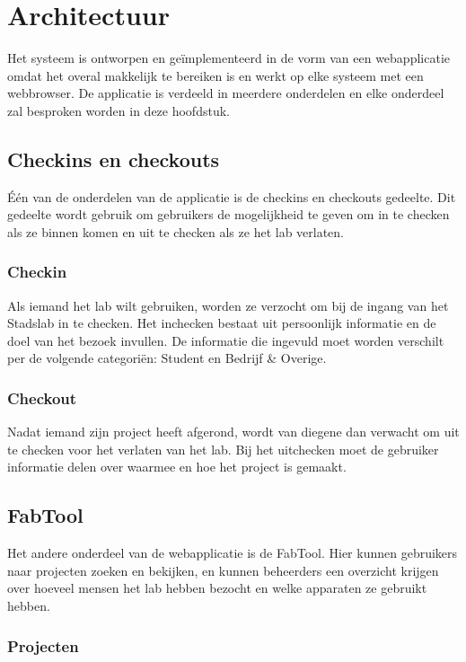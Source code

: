 \chapter{Architectuur}

Het systeem is ontworpen en ge\"implementeerd in de vorm van een webapplicatie omdat het overal makkelijk te bereiken is en werkt op elke systeem met een webbrowser. De applicatie is verdeeld in meerdere onderdelen en elke onderdeel zal besproken worden in deze hoofdstuk.

\section{Checkins en checkouts}

\'E\'en van de onderdelen van de applicatie is de checkins en checkouts gedeelte. Dit gedeelte wordt gebruik om gebruikers de mogelijkheid te geven om in te checken als ze binnen komen en uit te checken als ze het lab verlaten.

\subsection{Checkin}

Als iemand het lab wilt gebruiken, worden ze verzocht om bij de ingang van het Stadslab in te checken. Het inchecken bestaat uit persoonlijk informatie en de doel van het bezoek invullen. De informatie die ingevuld moet worden verschilt per de volgende categori\"en: Student en Bedrijf \& Overige.

\subsection{Checkout}

Nadat iemand zijn project heeft afgerond, wordt van diegene dan verwacht om uit te checken voor het verlaten van het lab. Bij het uitchecken moet de gebruiker informatie delen over waarmee en hoe het project is gemaakt.

\section{FabTool}

Het andere onderdeel van de webapplicatie is de FabTool. Hier kunnen gebruikers naar projecten zoeken en bekijken, en kunnen beheerders een overzicht krijgen over hoeveel mensen het lab hebben bezocht en welke apparaten ze gebruikt hebben.

\subsection{Projecten}

